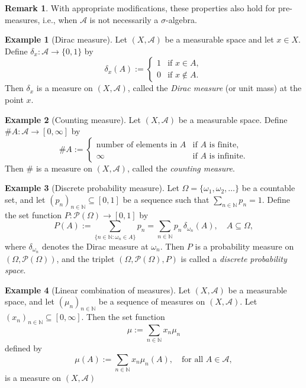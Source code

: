\documentclass[12pt]{article}
\theoremstyle{definition}
\newtheorem{example}{Example}[section]
\newtheorem{remark}{Remark}[section]
\begin{document}
\begin{remark}
With appropriate modifications, these properties also hold for pre-measures, i.e., when \(\mathcal{A}\) is not necessarily a \(\sigma\)-algebra.
\end{remark}


\medskip
\begin{example}[Dirac measure]
Let \((X, \mathcal{A})\) be a measurable space and let \(x \in X\). Define \(\delta_x : \mathcal{A} \to \{0,1\}\) by
\[
\delta_x(A) := 
\begin{cases}
1 & \text{if } x \in A, \\
0 & \text{if } x \notin A.
\end{cases}
\]
Then \(\delta_x\) is a measure on \((X, \mathcal{A})\), called the \emph{Dirac measure} (or unit mass) at the point \(x\).
\end{example}

\medskip
\begin{example}[Counting measure]
Let \((X, \mathcal{A})\) be a measurable space. Define \(\#A : \mathcal{A} \to [0, \infty]\) by
\[
\#A :=
\begin{cases}
\text{number of elements in } A & \text{if } A \text{ is finite}, \\
\infty & \text{if } A \text{ is infinite}.
\end{cases}
\]
Then \(\#\) is a measure on \((X, \mathcal{A})\), called the \emph{counting measure}.
\end{example}


\medskip
\begin{example}[Discrete probability measure]
Let \(\Omega = \{ \omega_1, \omega_2, \dots \}\) be a countable set, and let \((p_n)_{n \in \mathbb{N}} \subseteq [0,1]\) be a sequence such that \(\sum_{n \in \mathbb{N}} p_n = 1\). Define the set function \(P : \mathcal{P}(\Omega) \to [0,1]\) by
\[
P(A) := \sum_{\{n \in \mathbb{N} : \omega_n \in A\}} p_n = \sum_{n \in \mathbb{N}} p_n \, \delta_{\omega_n}(A), \quad A \subseteq \Omega,
\]
where \(\delta_{\omega_n}\) denotes the Dirac measure at \(\omega_n\). Then \(P\) is a probability measure on \((\Omega, \mathcal{P}(\Omega))\), and the triplet \((\Omega, \mathcal{P}(\Omega), P)\) is called a \emph{discrete probability space}.
\end{example}


\medskip
\begin{example}[Linear combination of measures]
Let \((X, \mathcal{A})\) be a measurable space, and let \((\mu_n)_{n \in \mathbb{N}}\) be a sequence of measures on \((X, \mathcal{A})\). Let \((x_n)_{n \in \mathbb{N}} \subseteq [0, \infty]\). Then the set function
\[
\mu := \sum_{n \in \mathbb{N}} x_n \mu_n
\]
defined by
\[
\mu(A) := \sum_{n \in \mathbb{N}} x_n \mu_n(A), \quad \text{for all } A \in \mathcal{A},
\]
is a measure on \((X, \mathcal{A})\)
\end{example}
\end{document}
